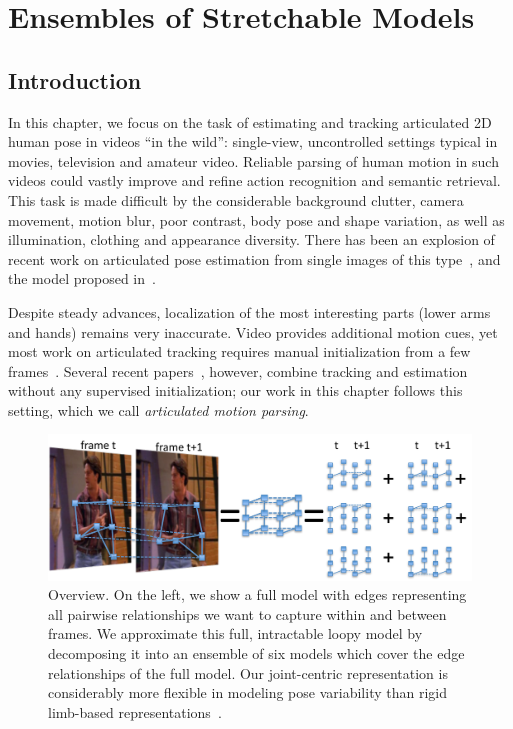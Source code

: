 \chapter{Ensembles of Stretchable Models} \label{sec:stretchable}
\section{Introduction}


In this chapter, we focus on the task of estimating and tracking articulated 2D 
human pose in videos ``in the wild'': single-view, uncontrolled settings 
typical in movies, television and amateur video.   Reliable
parsing of human motion in such videos could vastly improve and refine action 
recognition and semantic retrieval. This task is made difficult by the 
considerable background clutter, camera movement, motion blur, poor contrast, 
body pose and shape variation, as well as illumination, clothing and appearance 
diversity. There has been an explosion of recent work on articulated pose 
estimation from single images of this type~\citep{ronfard02, 
miko04,felz05,ramanan06,ferrari08,eichner09, andriluka09}, and the model 
proposed in~.  

Despite steady advances, localization of the most interesting parts (lower arms 
and hands) remains very inaccurate.  Video provides additional motion cues, yet 
most work on articulated tracking requires manual initialization from a few
frames~\cite{cardboard02,bregler98,balan06,sminchisescu03,ren07,buehler08}.  
Several recent papers~\cite{sigal04, lan05,ramanan05,ferrari08,weisssapp10}, 
however, combine tracking and estimation without any supervised initialization; 
our work in this chapter follows this setting, which we call {\em articulated 
motion parsing}.

\begin{figure}[t!]
\centering
\includegraphics[width=0.99\linewidth]{figs/stretchable-overview.pdf}
\caption[Stretchable Ensembles overview]{\small \label{fig:overview} Overview.  
On the left, we show a full model with edges representing all pairwise 
relationships we want to capture within and between frames.  We approximate 
this full, intractable loopy model by decomposing it into an ensemble of six 
models which cover the edge relationships of the full model.  Our joint-centric 
representation is considerably more flexible in modeling pose variability than 
rigid limb-based 
representations~\cite{ferrari08,sapp2010cascades,andriluka09}.}
\label{fig:stretchable-overview}
\end{figure}

